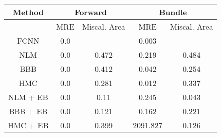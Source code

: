 \documentclass[convert={outext=.png}]{standalone}
\begin{document}
\begin{tabular}{c c c c c}
\hline
\hline
Method &  \multicolumn{2}{c}{Forward} & \multicolumn{2}{c}{Bundle} \\ \hline
 & MRE & Miscal. Area & MRE & Miscal. Area \\
 FCNN & 0.0 & - & 0.003 & - \\
 \hline
 NLM & 0.0 & 0.472 & 0.219 & 0.484 \\
 BBB & 0.0 & 0.412 & 0.042 & 0.254 \\
 HMC & 0.0 & 0.281 & 0.012 & 0.337 \\
 \hline
 NLM + EB & 0.0 & 0.11 & 0.245 & 0.043 \\
 BBB + EB & 0.0 & 0.121 & 0.162 & 0.221 \\
 HMC + EB & 0.0 & 0.399 & 2091.827 & 0.126 \\
\hline
\hline
\end{tabular}
\end{document}
